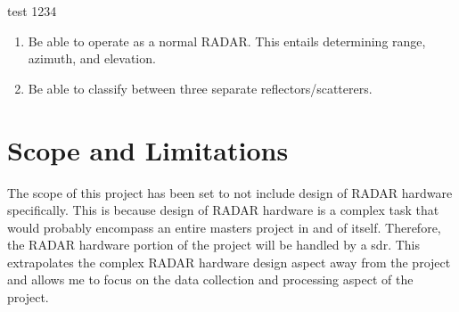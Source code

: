 \documentclass[class=report,11pt,crop=false]{standalone}
\begin{document}
test 1234

\begin{enumerate}
    \item Be able to operate as a normal RADAR. This entails determining range, azimuth, and elevation. 
    \item Be able to classify between three separate reflectors/scatterers.
\end{enumerate}

\section{Scope and Limitations}
The scope of this project has been set to not include design of RADAR hardware specifically. This is because design of RADAR hardware is a complex task that would probably encompass an entire masters project in and of itself. Therefore, the RADAR hardware portion of the project will be handled by a \gls{sdr}. This extrapolates the complex RADAR hardware design aspect away from the project and allows me to focus on the data collection and processing aspect of the project.

\ifstandalone

\printnoidxglossary[type=\acronymtype,nonumberlist]
\fi
\end{document}
